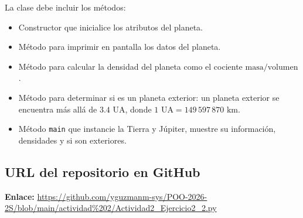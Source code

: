\documentclass[11pt,a4paper]{article}
\begin{document}
La clase debe incluir los métodos:
\begin{itemize}
    \item Constructor que inicialice los atributos del planeta.
    \item Método para imprimir en pantalla los datos del planeta.
    \item Método para calcular la densidad del planeta como el cociente $\text{masa} / \text{volumen}$.
    \item Método para determinar si es un planeta exterior: un planeta exterior se encuentra más allá de $3.4\text{ UA}$, donde $1\text{ UA} = 149\,597\,870\text{ km}$.
    \item Método \texttt{main} que instancie la Tierra y Júpiter, muestre su información, densidades y si son exteriores.
\end{itemize}

\subsection{URL del repositorio en GitHub}
\noindent \textbf{Enlace:} \url{https://github.com/yguzmanm-sys/POO-2026-2S/blob/main/actividad%202/Actividad2_Ejercicio2_2.py}
\end{document}
